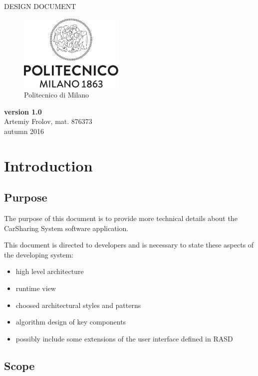 \documentclass[12pt, letterpaper]{article}
\begin{document}
\begin{titlepage}
\centering
{\Large DESIGN DOCUMENT} \\
\begin{figure}[H]
\centering
\includegraphics[width=5cm]{Logo_Politecnico_Milano.png}
\caption{Politecnico di Milano}
\label{fig:PoliMi}
\end{figure}
\textbf{version 1.0} \\
\vspace{0.5cm}
Artemiy Frolov, mat. 876373 \\
\vspace{0.5cm}
autumn 2016
\end{titlepage}


\tableofcontents{}

\newpage

\section{Introduction}
\subsection{Purpose}

The purpose of this document is to provide more technical details about the CarSharing System software application.

This document is directed to developers and is necessary to state these aspects of the developing system: 
\begin{itemize}
	\item high level architecture 
	\item runtime view 
	\item choosed architectural styles and patterns
	\item algorithm design of key components 
	\item possibly include some extensions of the user interface defined in RASD 
\end{itemize}

\subsection{Scope}
\end{document}
